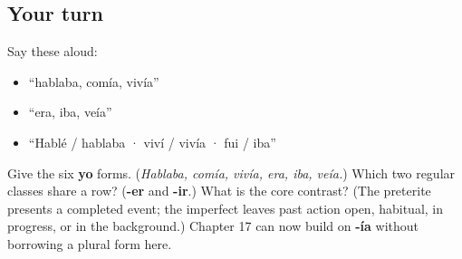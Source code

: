 \subsection*{Your turn}
Say these aloud:

\begin{itemize}
\raggedright
  \item “hablaba, comía, vivía”
  \item “era, iba, veía”
  \item “Hablé / hablaba · viví / vivía · fui / iba”
\end{itemize}

\begin{tcolorbox}[breakable,colback=teal!4,colframe=teal!35!black,title={Before you move on}]
Give the six \textbf{yo} forms. (\emph{Hablaba, comía, vivía, era, iba, veía.}) Which two regular classes share a row? (\textbf{-er} and \textbf{-ir}.) What is the core contrast? (The preterite presents a completed event; the imperfect leaves past action open, habitual, in progress, or in the background.) Chapter 17 can now build on \textbf{-ía} without borrowing a plural form here.
\end{tcolorbox}
